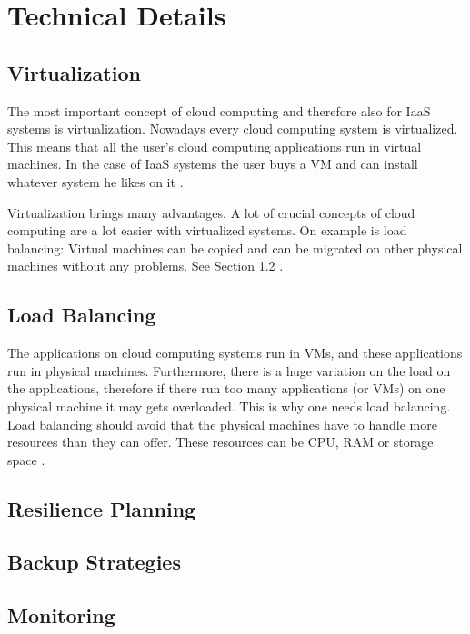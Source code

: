 \chapter{Technical Details}
\label{chap:implementation}

\section{Virtualization}
The most important concept of cloud computing and therefore also for IaaS systems is virtualization. Nowadays every cloud computing system is virtualized. This means that all the user's cloud computing applications run in virtual machines. In the case of IaaS systems the user buys a VM and can install whatever system he likes on it \cite{Arzuaga_2010}. 

Virtualization brings many advantages. A lot of crucial concepts of cloud computing are a lot easier with virtualized systems. On example is load balancing: Virtual machines can be copied and can be migrated on other physical machines without any problems. See Section \ref{sec:load_balancing} \cite{Arzuaga_2010}.

\section{Load Balancing}
\label{sec:load_balancing}
The applications on cloud computing systems run in VMs, and these applications run in physical machines. Furthermore, there is a huge variation on the load on the applications, therefore if there run too many applications (or VMs) on one physical machine it may gets overloaded. This is why one needs load balancing. Load balancing should avoid that the physical machines have to handle more resources than they can offer. These resources can be CPU, RAM or storage space \cite{Chen_2014}. 


\section{Resilience Planning}

\section{Backup Strategies}

\section{Monitoring}